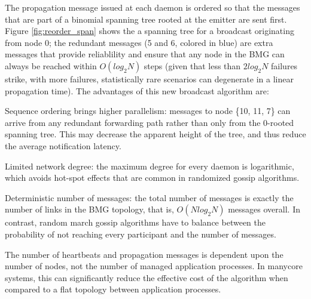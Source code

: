 \documentclass[sigconf]{acmart}
\begin{document}
The propagation message issued at each daemon is ordered so that the
messages that are part of a binomial spanning tree rooted at the emitter
are sent first. Figure \ref{fig:reorder_span} shows the a spanning tree
for a broadcast originating from node 0; the redundant messages (5 and 6, colored
in blue) are extra messages that provide reliablility and ensure that
any node in the BMG can always be reached within $O(log_2 N)$ steps (given
that less than $2 log_2 N$ failures strike, with more failures,
statistically rare scenarios can degenerate in a linear propagation time).
The advantages of this new broadcast algorithm are:
\begin{compactenum}
  \item Sequence ordering brings higher parallelism: messages to node \{10, 11, 7\} can arrive from any redundant forwarding path rather than only from the 0-rooted spanning tree. This may decrease the apparent height of the tree, and thus reduce the average notification latency.
  \item Limited network degree: the maximum degree for every daemon is logarithmic, which avoids hot-spot effects that are common in randomized gossip algorithms.
  \item Deterministic number of messages: the total number of messages is
  exactly the number of links in the BMG topology, that is, $O(N log_2 N)$
  messages overall. In contrast, random march gossip algorithms have to
  balance between the probability of not reaching every participant and 
  the number of messages.
  \item The number of heartbeats and propagation messages is dependent upon
  the number of nodes, not the number of managed application processes.
  In manycore systems, this can significantly reduce the
  effective cost of the algorithm when compared to a flat topology between
  application processes.
\end{compactenum}
\end{document}

